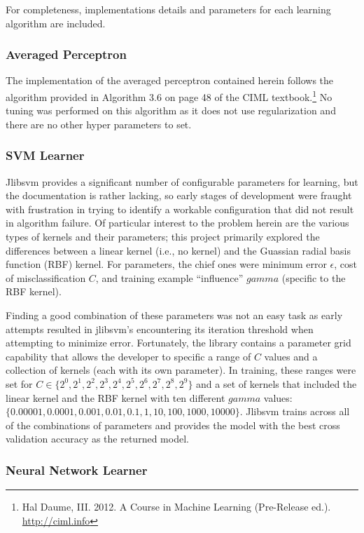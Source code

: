\documentclass[10pt,letterpaper]{article}
\begin{document}
For completeness, implementations details and parameters for each learning algorithm are included.

\subsubsection{Averaged Perceptron}

The implementation of the averaged perceptron contained herein follows the algorithm provided in Algorithm 3.6 on page 48 of the CIML textbook.\footnote{Hal Daume, III. 2012. A Course in Machine Learning (Pre-Release ed.). \url{http://ciml.info}}
No tuning was performed on this algorithm as it does not use regularization and there are no other hyper parameters to set.

\subsubsection{SVM Learner}

Jlibsvm provides a significant number of configurable parameters for learning, but the documentation is rather lacking, so early stages of development were fraught with frustration in trying to identify a workable configuration that did not result in algorithm failure.
Of particular interest to the problem herein are the various types of kernels and their parameters; this project primarily explored the differences between a linear kernel (i.e., no kernel) and the Guassian radial basis function (RBF) kernel.
For parameters, the chief ones were minimum error $\epsilon$, cost of misclassification $C$,  and training example ``influence'' $gamma$ (specific to the RBF kernel).

Finding a good combination of these parameters was not an easy task as early attempts resulted in jlibsvm's encountering its iteration threshold when attempting to minimize error.
Fortunately, the library contains a parameter grid capability that allows the developer to specific a range of $C$ values and a collection of kernels (each with its own parameter).
In training, these ranges were set for $C \in \{ 2^0, 2^1, 2^2, 2^3, 2^4, 2^5, 2^6, 2^7, 2^8, 2^9 \}$ and a set of kernels that included the linear kernel and the RBF kernel with ten different $gamma$ values: $\{ 0.00001, 0.0001, 0.001, 0.01, 0.1, 1, 10, 100, 1000, 10000 \}$.
Jlibsvm trains across all of the combinations of parameters and provides the model with the best cross validation accuracy as the returned model.

\subsubsection{Neural Network Learner}
\end{document}
